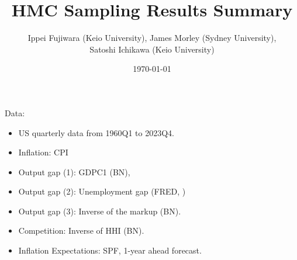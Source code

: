 \documentclass{beamer}
\title{HMC Sampling Results Summary}
\author{Ippei Fujiwara (Keio University), James Morley (Sydney University), \\ Satoshi Ichikawa (Keio University)}
\date{\today}
\begin{document}
\begin{frame}
  \titlepage
\end{frame}

\begin{frame}
  Data: 
  \begin{itemize}
    \item US quarterly data from 1960Q1 to 2023Q4.
    \item Inflation: CPI
    \item Output gap (1): GDPC1 (BN),
    \item Output gap (2): Unemployment gap (FRED, )
    \item Output gap (3): Inverse of the markup (BN).
    \item Competition: Inverse of HHI (BN).
    \item Inflation Expectations: SPF, 1-year ahead forecast.
  \end{itemize}
\end{frame}
\end{document}
